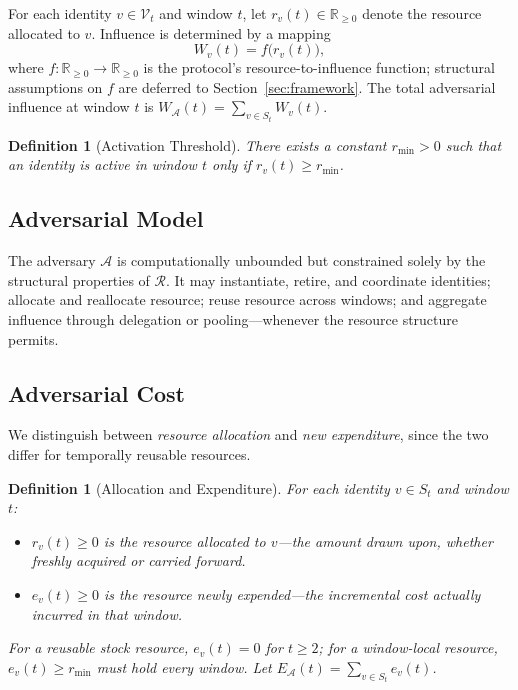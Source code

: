 \documentclass[manuscript,review]{acmart}
\newtheorem{definition}[theorem]{Definition}
\theoremstyle{remark}
\begin{document}
	For each identity $v \in \mathcal{V}_t$ and window $t$,
	let $r_v(t) \in \mathbb{R}_{\geq 0}$ denote the
	resource allocated to $v$.
	Influence is determined by a mapping
	\begin{equation}
		W_v(t) = f\bigl(r_v(t)\bigr),
	\end{equation}
	where $f : \mathbb{R}_{\geq 0} \to \mathbb{R}_{\geq 0}$
	is the protocol's resource-to-influence function;
	structural assumptions on $f$ are deferred to
	Section~\ref{sec:framework}.
	The total adversarial influence at window $t$ is
	$W_{\mathcal{A}}(t) = \sum_{v \in S_t} W_v(t)$.
	
	\begin{definition}[Activation Threshold]
		\label{def:threshold}
		There exists a constant $r_{\min} > 0$ such that
		an identity is active in window $t$ only if
		$r_v(t) \geq r_{\min}$.
	\end{definition}
	
	\subsection{Adversarial Model}
	\label{ssec:adversary}
	
	The adversary $\mathcal{A}$ is computationally
	unbounded but constrained solely by the structural
	properties of $\mathcal{R}$.
	It may instantiate, retire, and coordinate identities;
	allocate and reallocate resource; reuse resource across
	windows; and aggregate influence through delegation or
	pooling---whenever the resource structure permits.
	
	\subsection{Adversarial Cost}
	\label{ssec:cost}
	
	We distinguish between \emph{resource allocation} and
	\emph{new expenditure}, since the two differ for
	temporally reusable resources.
	
	\begin{definition}[Allocation and Expenditure]
		\label{def:allocation_expenditure}
		For each identity $v \in S_t$ and window $t$:
		\begin{itemize}
			\item $r_v(t) \geq 0$ is the resource
			\emph{allocated} to $v$---the amount drawn upon,
			whether freshly acquired or carried forward.
			\item $e_v(t) \geq 0$ is the resource
			\emph{newly expended}---the incremental cost
			actually incurred in that window.
		\end{itemize}
		For a reusable stock resource, $e_v(t) = 0$ for
		$t \geq 2$; for a window-local resource,
		$e_v(t) \geq r_{\min}$ must hold every window.
		Let $E_{\mathcal{A}}(t) = \sum_{v \in S_t} e_v(t)$.
	\end{definition}
	
\end{document}
